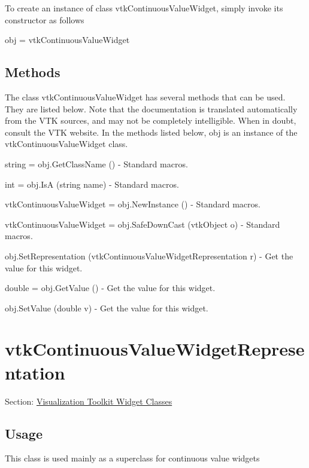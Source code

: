 To create an instance of class vtk\-Continuous\-Value\-Widget, simply invoke its constructor as follows \begin{DoxyVerb}  obj = vtkContinuousValueWidget
\end{DoxyVerb}
 \hypertarget{vtkwidgets_vtkxyplotwidget_Methods}{}\subsection{Methods}\label{vtkwidgets_vtkxyplotwidget_Methods}
The class vtk\-Continuous\-Value\-Widget has several methods that can be used. They are listed below. Note that the documentation is translated automatically from the V\-T\-K sources, and may not be completely intelligible. When in doubt, consult the V\-T\-K website. In the methods listed below, {\ttfamily obj} is an instance of the vtk\-Continuous\-Value\-Widget class. 
\begin{DoxyItemize}
\item {\ttfamily string = obj.\-Get\-Class\-Name ()} -\/ Standard macros.  
\item {\ttfamily int = obj.\-Is\-A (string name)} -\/ Standard macros.  
\item {\ttfamily vtk\-Continuous\-Value\-Widget = obj.\-New\-Instance ()} -\/ Standard macros.  
\item {\ttfamily vtk\-Continuous\-Value\-Widget = obj.\-Safe\-Down\-Cast (vtk\-Object o)} -\/ Standard macros.  
\item {\ttfamily obj.\-Set\-Representation (vtk\-Continuous\-Value\-Widget\-Representation r)} -\/ Get the value for this widget.  
\item {\ttfamily double = obj.\-Get\-Value ()} -\/ Get the value for this widget.  
\item {\ttfamily obj.\-Set\-Value (double v)} -\/ Get the value for this widget.  
\end{DoxyItemize}\hypertarget{vtkwidgets_vtkcontinuousvaluewidgetrepresentation}{}\section{vtk\-Continuous\-Value\-Widget\-Representation}\label{vtkwidgets_vtkcontinuousvaluewidgetrepresentation}
Section\-: \hyperlink{sec_vtkwidgets}{Visualization Toolkit Widget Classes} \hypertarget{vtkwidgets_vtkxyplotwidget_Usage}{}\subsection{Usage}\label{vtkwidgets_vtkxyplotwidget_Usage}
This class is used mainly as a superclass for continuous value widgets

